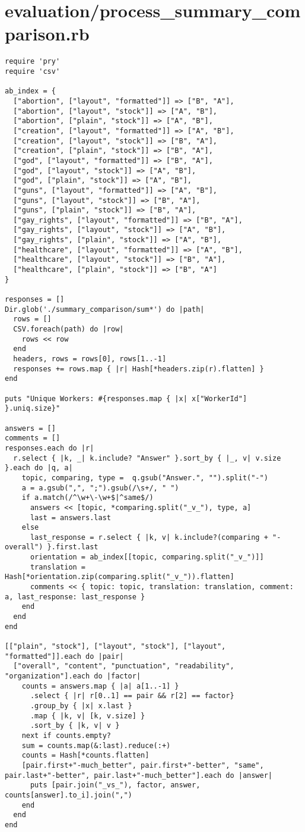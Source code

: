 \documentclass{article}
\begin{document}
\section*{evaluation/process\_summary\_comparison.rb}
\begin{verbatim}
require 'pry'
require 'csv'

ab_index = {
  ["abortion", ["layout", "formatted"]] => ["B", "A"],
  ["abortion", ["layout", "stock"]] => ["A", "B"],
  ["abortion", ["plain", "stock"]] => ["A", "B"],
  ["creation", ["layout", "formatted"]] => ["A", "B"],
  ["creation", ["layout", "stock"]] => ["B", "A"],
  ["creation", ["plain", "stock"]] => ["B", "A"],
  ["god", ["layout", "formatted"]] => ["B", "A"],
  ["god", ["layout", "stock"]] => ["A", "B"],
  ["god", ["plain", "stock"]] => ["A", "B"],
  ["guns", ["layout", "formatted"]] => ["A", "B"],
  ["guns", ["layout", "stock"]] => ["B", "A"],
  ["guns", ["plain", "stock"]] => ["B", "A"],
  ["gay_rights", ["layout", "formatted"]] => ["B", "A"],
  ["gay_rights", ["layout", "stock"]] => ["A", "B"],
  ["gay_rights", ["plain", "stock"]] => ["A", "B"],
  ["healthcare", ["layout", "formatted"]] => ["A", "B"],
  ["healthcare", ["layout", "stock"]] => ["B", "A"],
  ["healthcare", ["plain", "stock"]] => ["B", "A"]
}

responses = []
Dir.glob('./summary_comparison/sum*') do |path|
  rows = []
  CSV.foreach(path) do |row|
    rows << row
  end
  headers, rows = rows[0], rows[1..-1]
  responses += rows.map { |r| Hash[*headers.zip(r).flatten] }
end

puts "Unique Workers: #{responses.map { |x| x["WorkerId"] }.uniq.size}"

answers = []
comments = []
responses.each do |r|
  r.select { |k, _| k.include? "Answer" }.sort_by { |_, v| v.size }.each do |q, a|
    topic, comparing, type =  q.gsub("Answer.", "").split("-")
    a = a.gsub(",", ";").gsub(/\s+/, " ")
    if a.match(/^\w+\-\w+$|^same$/)
      answers << [topic, *comparing.split("_v_"), type, a]
      last = answers.last
    else
      last_response = r.select { |k, v| k.include?(comparing + "-overall") }.first.last
      orientation = ab_index[[topic, comparing.split("_v_")]]
      translation = Hash[*orientation.zip(comparing.split("_v_")).flatten]
      comments << { topic: topic, translation: translation, comment: a, last_response: last_response }
    end
  end
end

[["plain", "stock"], ["layout", "stock"], ["layout", "formatted"]].each do |pair|
  ["overall", "content", "punctuation", "readability", "organization"].each do |factor|
    counts = answers.map { |a| a[1..-1] }
      .select { |r| r[0..1] == pair && r[2] == factor}
      .group_by { |x| x.last }
      .map { |k, v| [k, v.size] }
      .sort_by { |k, v| v }
    next if counts.empty?
    sum = counts.map(&:last).reduce(:+)
    counts = Hash[*counts.flatten]
    [pair.first+"-much_better", pair.first+"-better", "same", pair.last+"-better", pair.last+"-much_better"].each do |answer|
      puts [pair.join("_vs_"), factor, answer, counts[answer].to_i].join(",")
    end
  end
end


\end{verbatim}
\end{document}
